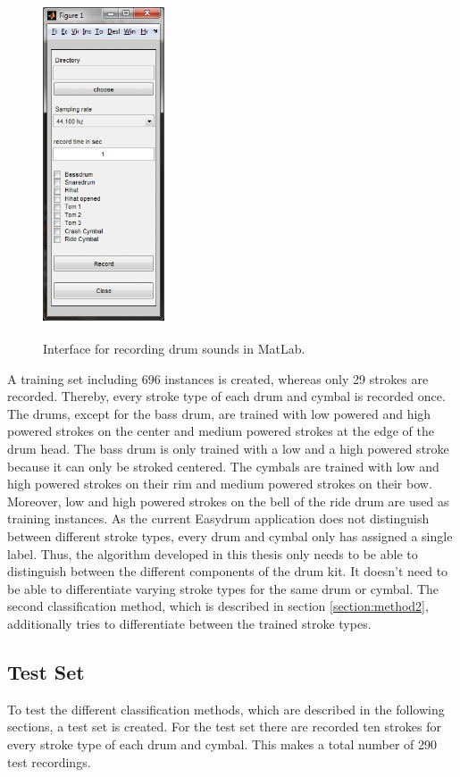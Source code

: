 \begin{figure}[htb]
	\centering
	\includegraphics[width=3.6cm]{images/recorderinterface.png}
	\label{}
	\caption{Interface for recording drum sounds in MatLab\textsuperscript{\textregistered}.}
	\label{fig:recorderInterface}
\end{figure}
A training set including 696 instances is created, whereas only 29 strokes are recorded. Thereby, every stroke type of each drum and cymbal is recorded once. The drums, except for the bass drum, are trained with low powered and high powered strokes on the center and medium powered strokes at the edge of the drum head. The bass drum is only trained with a low and a high powered stroke because it can only be stroked centered. The cymbals are trained with low and high powered strokes on their rim and medium powered strokes on their bow. Moreover, low and high powered strokes on the bell of the ride drum are used as training instances. As the current Easydrum application does not distinguish between different stroke types, every drum and cymbal only has assigned a single label. Thus, the algorithm developed in this thesis only needs to be able to distinguish between the different components of the drum kit. It doesn't need to be able to differentiate varying stroke types for the same drum or cymbal. The second classification method, which is described in section \ref{section:method2}, additionally tries to differentiate between the trained stroke types.

\subsection{Test Set}
\label{section:testset}

To test the different classification methods, which are described in the following sections, a test set is created. For the test set there are recorded ten strokes for every stroke type of each drum and cymbal. This makes a total number of 290 test recordings.
